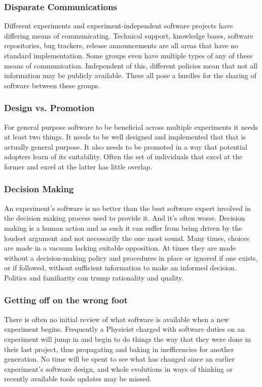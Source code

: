 \subsubsection{Disparate Communications}

Different experiments and experiment-independent software projects
have differing means of communicating.  Technical support, knowledge
bases, software repositories, bug trackers, release announcements are
all areas that have no standard implementation.  Some groups even
have multiple types of any of these means of communication.
Independent of this, different policies mean that not all information
may be publicly available.  These all pose a hurdles for the sharing of 
software between these groups.

\subsubsection{Design vs. Promotion}

For general purpose software to be beneficial across multiple
experiments it needs at least two things.  It needs to be well
designed and implemented that that is actually general purpose.  It
also needs to be promoted in a way that potential adopters learn of
its suitability.  Often the set of individuals that excel at the
former and excel at the latter has little overlap.

\subsubsection{Decision Making}

An experiment's software is no better than the best software expert
involved in the decision making process used to provide it. And it's often worse.
Decision making is a human action and as such it can suffer from being
driven by the loudest argument and not necessarily the one most sound.
Many times, choices are made in a vacuum lacking suitable opposition.
At times they are made without a decision-making policy and procedures in place or
ignored if one exists, or if followed, without sufficient information
to make an informed decision.  Politics and familiarity can trump
rationality and quality.

\subsubsection{Getting off on the wrong foot}

There is often no initial review of what software is available when a new experiment begins.
Frequently a Physicist charged with software duties on an experiment will 
jump in and begin to do things the way that they were done in their 
last project, thus propagating and baking in inefficencies for another generation.  
No time will be spent to see what has changed since an earlier experiment's 
software design, and whole evolutions in ways of thinking or recently available
tools updates may be missed.

